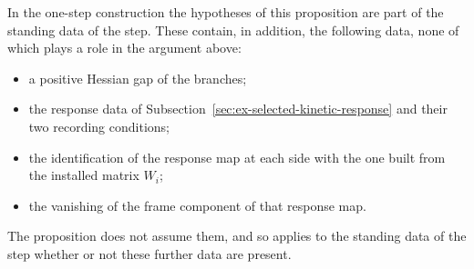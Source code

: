 In the one-step construction the hypotheses of this proposition are
part of the standing data of the step. These contain, in addition, the
following data, none of which plays a role in the argument above:
\begin{itemize}
\item a positive Hessian gap of the branches;
\item the response data of Subsection~\ref{sec:ex-selected-kinetic-response}
and their two recording conditions;
\item the identification of the response map at each side with the one
built from the installed matrix $W_i$;
\item the vanishing of the frame component of that response map.
\end{itemize}
The proposition does not assume them, and so applies to the standing
data of the step whether or not these further data are present.
